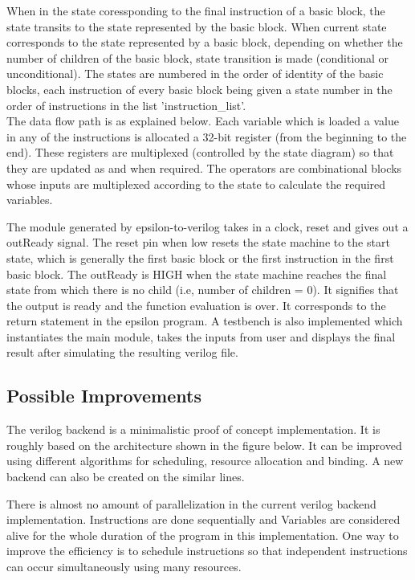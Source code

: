 \documentclass[titlepage]{article}
\begin{document}
        When in the  state coressponding to the final instruction of a basic block, the state transits to the state represented by the basic block. When current state corresponds to the state represented by a basic block, depending on whether the number of children of the basic block, state transition is made (conditional or unconditional). The states are numbered in the order of identity of the basic blocks, each instruction of every basic block being given a state number in the order of instructions in the list 'instruction\_list'.\\ The data flow path is as explained below. Each variable which is loaded a value in any of the instructions is allocated a 32-bit register (from the beginning to the end). These registers are multiplexed (controlled by the state diagram) so that they are updated as and when required. The operators are combinational blocks whose inputs are multiplexed according to the state to calculate the required variables.

        The module generated by epsilon-to-verilog takes in a clock, reset and gives out a outReady signal. The reset pin when low resets the state machine to the start state, which is generally the first basic block or the first instruction in the first basic block. The outReady is HIGH when the state machine reaches the final state from which there is no child (i.e, number of children = 0). It signifies that the output is ready and the function evaluation is over. It corresponds to the return statement in the epsilon program.
        A testbench is also implemented which instantiates the main module, takes the inputs from user and displays the final result after simulating the resulting verilog file.

    \subsection{Possible Improvements}
        The verilog backend is a minimalistic proof of concept implementation. It is roughly based on the architecture shown in the figure below. It can be improved using different algorithms for scheduling, resource allocation and binding. A new backend can also be created on the similar lines.
        
        
        There is almost no amount of parallelization in the current verilog backend implementation. Instructions are done sequentially and Variables are considered alive for the whole duration of the program in this implementation. One way to improve the efficiency is to schedule instructions so that independent instructions can occur simultaneously using many resources. 
        
\end{document}
